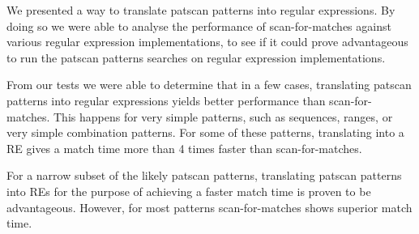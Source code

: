 \documentclass[12pt]{article}
\theoremstyle{definition}
\begin{document}
We presented a way to translate patscan patterns into regular expressions. By doing so we were able to analyse the performance of scan-for-matches against various regular expression implementations, to see if it could prove advantageous to run the patscan patterns searches on regular expression implementations.

From our tests we were able to determine that in a few cases, translating patscan patterns into regular expressions yields better performance than scan-for-matches. This happens for very simple patterns, such as sequences, ranges, or very simple combination patterns. For some of these patterns, translating into a RE gives a match time more than 4 times faster than scan-for-matches.

For a narrow subset of the likely patscan patterns, translating patscan patterns into REs for the purpose of achieving a faster match time is proven to be advantageous. However, for most patterns scan-for-matches shows superior match time.

\newpage


\nocite{*}

\end{document}
